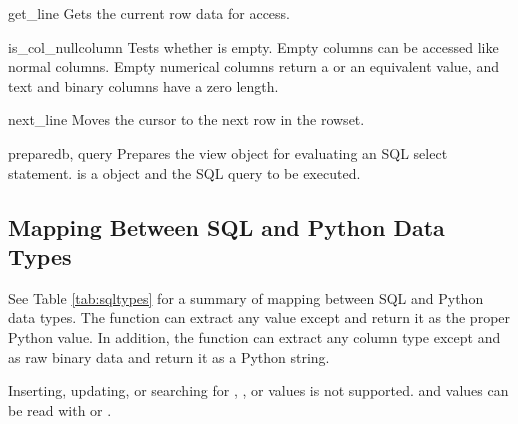 \begin{methoddesc}[Db_view]{get_line}{}
Gets the current row data for access.
\end{methoddesc}

\begin{methoddesc}[Db_view]{is_col_null}{column}
Tests whether  is empty. Empty columns can be 
accessed like normal columns. Empty numerical columns return a  or 
an equivalent value, and text and binary columns have a zero length.
\end{methoddesc}

\begin{methoddesc}[Db_view]{next_line}{}
Moves the cursor to the next row in the rowset.
\end{methoddesc}

\begin{methoddesc}[Db_view]{prepare}{db, query}
Prepares the view object for evaluating an SQL select statement. 
 is a  object and 
the SQL query to be executed.
\end{methoddesc}

\subsection{Mapping Between SQL and Python Data Types }
\label{subsec:mapping}
See Table \ref{tab:sqltypes} for a summary of mapping between SQL and 
Python data types. The  function can extract any value except 
 and return it as the proper Python value. In 
addition, the  function can extract any column type 
except  and  as raw binary data 
and return it as a Python string.

Inserting, updating, or searching for , , 
or  values is not supported.  and 
 values can be read with  or 
.

